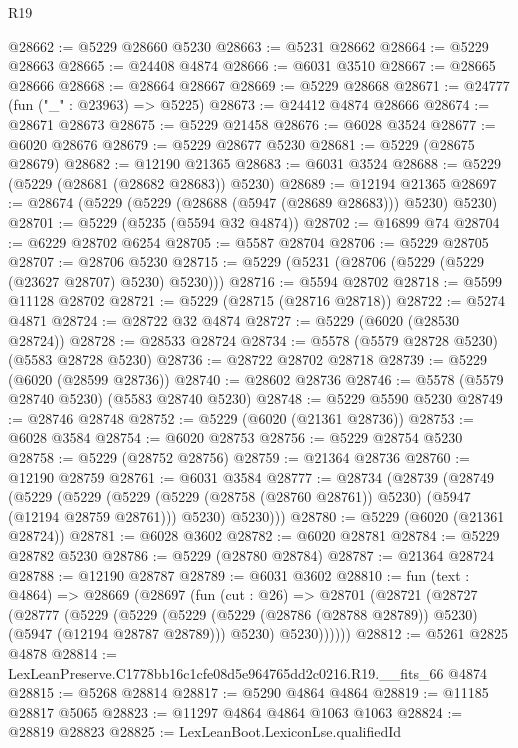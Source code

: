 \begin{lexlean}{R19}
\begin{coremodule}
@28662 := @5229 @28660 @5230
@28663 := @5231 @28662
@28664 := @5229 @28663
@28665 := @24408 @4874
@28666 := @6031 @3510
@28667 := @28665 @28666
@28668 := @28664 @28667
@28669 := @5229 @28668
@28671 := @24777 (fun ("_" : @23963) => @5225)
@28673 := @24412 @4874 @28666
@28674 := @28671 @28673
@28675 := @5229 @21458
@28676 := @6028 @3524
@28677 := @6020 @28676
@28679 := @5229 @28677 @5230
@28681 := @5229 (@28675 @28679)
@28682 := @12190 @21365
@28683 := @6031 @3524
@28688 := @5229 (@5229 (@28681 (@28682 @28683)) @5230)
@28689 := @12194 @21365
@28697 := @28674 (@5229 (@5229 (@28688 (@5947 (@28689 @28683))) @5230) @5230)
@28701 := @5229 (@5235 (@5594 @32 @4874))
@28702 := @16899 @74
@28704 := @6229 @28702 @6254
@28705 := @5587 @28704
@28706 := @5229 @28705
@28707 := @28706 @5230
@28715 := @5229 (@5231 (@28706 (@5229 (@5229 (@23627 @28707) @5230) @5230)))
@28716 := @5594 @28702
@28718 := @5599 @11128 @28702
@28721 := @5229 (@28715 (@28716 @28718))
@28722 := @5274 @4871
@28724 := @28722 @32 @4874
@28727 := @5229 (@6020 (@28530 @28724))
@28728 := @28533 @28724
@28734 := @5578 (@5579 @28728 @5230) (@5583 @28728 @5230)
@28736 := @28722 @28702 @28718
@28739 := @5229 (@6020 (@28599 @28736))
@28740 := @28602 @28736
@28746 := @5578 (@5579 @28740 @5230) (@5583 @28740 @5230)
@28748 := @5229 @5590 @5230
@28749 := @28746 @28748
@28752 := @5229 (@6020 (@21361 @28736))
@28753 := @6028 @3584
@28754 := @6020 @28753
@28756 := @5229 @28754 @5230
@28758 := @5229 (@28752 @28756)
@28759 := @21364 @28736
@28760 := @12190 @28759
@28761 := @6031 @3584
@28777 := @28734
    (@28739
      (@28749
        (@5229
          (@5229
            (@5229 (@5229 (@28758 (@28760 @28761)) @5230) (@5947 (@12194 @28759 @28761)))
            @5230)
          @5230)))
@28780 := @5229 (@6020 (@21361 @28724))
@28781 := @6028 @3602
@28782 := @6020 @28781
@28784 := @5229 @28782 @5230
@28786 := @5229 (@28780 @28784)
@28787 := @21364 @28724
@28788 := @12190 @28787
@28789 := @6031 @3602
@28810 := fun (text : @4864) =>
  @28669
    (@28697
      (fun (cut : @26) =>
      @28701
        (@28721
          (@28727
            (@28777
              (@5229
                (@5229
                  (@5229 (@5229 (@28786 (@28788 @28789)) @5230) (@5947 (@12194 @28787 @28789)))
                  @5230)
                @5230))))))
@28812 := @5261 @2825 @4878
@28814 := LexLeanPreserve.C1778bb16c1cfe08d5e964765dd2c0216.R19.__fits_66 @4874
@28815 := @5268 @28814
@28817 := @5290 @4864 @4864
@28819 := @11185 @28817 @5065
@28823 := @11297 @4864 @4864 @1063 @1063
@28824 := @28819 @28823
@28825 := LexLeanBoot.LexiconLse.qualifiedId

\end{coremodule}
\end{lexlean}
